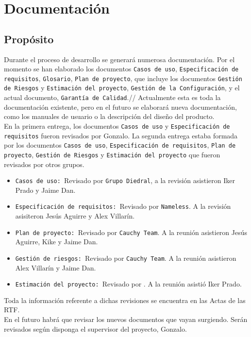 \documentclass[spanish,a4paper,11pt, twoside]{report}	%
\begin{document}
\chapter{ Documentación}%
	
	
	\section{Propósito}
			Durante el proceso de desarrollo se generará numerosa documentación.
		Por el momento se han elaborado los documentos \texttt{Casos de uso}, \texttt{Especificación de requisitos}, \texttt{Glosario}, \texttt{Plan de proyecto}, 
		que incluye los documentos \texttt{Gestión de Riesgos} y \texttt{Estimación del proyecto}, \texttt{Gestión de la Configuración}, 
		y el actual documento, \texttt{Garantía de Calidad}.//
		Actualmente esta es toda la documentación existente, pero en el futuro se elaborará nueva documentación, 
		como los manuales de usuario o la descripción del diseño del producto.\\
			En la primera entrega, los documentos \texttt{Casos de uso} y \texttt{Especificación de requisitos} fueron revisados por Gonzalo. 
		La segunda entrega estaba formada por los documentos \texttt{Casos de uso}, \texttt{Especificación de requisitos}, \texttt{Plan de proyecto}, 
		\texttt{Gestión de Riesgos} y \texttt{Estimación del proyecto} que fueron revisados por otros grupos.
		 \begin{itemize}
		   \item \texttt{Casos de uso: }Revisado por \texttt{Grupo Diedral}, a la revisión asistieron Iker Prado y Jaime Dan.
		   \item \texttt{Especificación de requisitos: }Revisado por \texttt{Nameless}. A la revisión asisiteron Jesús Aguirre y Alex Villarín.
		   \item \texttt{Plan de proyecto: }Revisado por \texttt{Cauchy Team}. A la reunión asistieron Jesús Aguirre, Kike y Jaime Dan.
		   \item \texttt{Gestión de riesgos: }Revisado por \texttt{Cauchy Team}. A la reunión asistieron Alex Villarín y Jaime Dan.
		   \item \texttt{Estimación del proyecto: }Revisado por \texttt{}. A la reunión asistió Iker Prado.%
		 \end{itemize}
		 Toda la información referente a dichas revisiones se encuentra en las Actas de las RTF.\\
		 En el futuro habrá que revisar los nuevos documentos que vayan surgiendo. Serán revisados según disponga el supervisor del proyecto, Gonzalo.
		 
\end{document}

